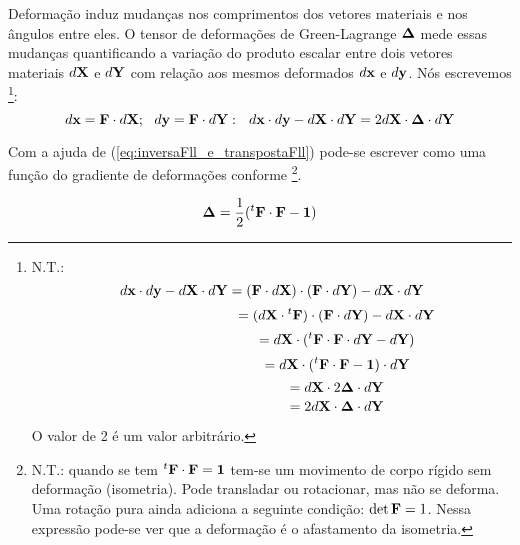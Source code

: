 \documentclass[
	11pt, %
	fleqn, %
	a4paper, %
]{LegrandOrangeBook}
\begin{document}
Deformação induz mudanças nos comprimentos dos vetores materiais e nos ângulos entre eles. O tensor de deformações de Green-Lagrange $\bm{\Delta}$ mede essas mudanças quantificando a variação do produto escalar entre dois vetores materiais $d\textbf{X}$ e $d\textbf{Y}$ com relação aos mesmos deformados $d\textbf{x}$ e $d\textbf{y}$. Nós escrevemos \footnote{N.T.: 
\begin{displaymath}	
	d\textbf{x} \cdot d\textbf{y} - d\textbf{X} \cdot d\textbf{Y} = (\textbf{F} \cdot d\textbf{X}) \cdot (\textbf{F} \cdot d\textbf{Y}) -  d\textbf{X} \cdot d\textbf{Y}
\end{displaymath}
\begin{displaymath}	
	~~~~~~~~~~~~~~~~~~~~~~~~~~~~ = (d\textbf{X} \cdot {}^t\textbf{F}) \cdot (\textbf{F} \cdot d\textbf{Y}) -  d\textbf{X} \cdot d\textbf{Y}
\end{displaymath}
\begin{displaymath}	
	~~~~~~~~~~~~~~~~~~~~~~~~~~~~ = d\textbf{X} \cdot ({}^t\textbf{F} \cdot \textbf{F} \cdot d\textbf{Y} -  d\textbf{Y})
\end{displaymath}
\begin{displaymath}	
	~~~~~~~~~~~~~~~~~~~~~~~~~~~~ = d\textbf{X} \cdot ({}^t\textbf{F} \cdot \textbf{F} -  \bm{1}) \cdot d\textbf{Y}
\end{displaymath}
\begin{displaymath}	
	~~~~~~~~~~~~~~~~~~~~~~~~~~~~ = d\textbf{X} \cdot 2 \bm{\Delta} \cdot d\textbf{Y}
\end{displaymath}
\begin{displaymath}	
	~~~~~~~~~~~~~~~~~~~~~~~~~~~~ = 2 d\textbf{X} \cdot \bm{\Delta} \cdot d\textbf{Y}
\end{displaymath}

O valor de 2 é um valor arbitrário.

}:
\begin{equation}
	\label{eq:dxdy}	
	d\textbf{x} = \textbf{F} \cdot d\textbf{X} ;  ~~ d\textbf{y} = \textbf{F} \cdot d\textbf{Y}: ~~ d\textbf{x} \cdot d\textbf{y} - d\textbf{X} \cdot d\textbf{Y} = 2d\textbf{X} \cdot \bm{\Delta} \cdot d\textbf{Y}
\end{equation}

Com a ajuda de (\ref{eq:inversaFll_e_transpostaFll}) pode-se escrever como uma função do gradiente de deformações conforme \footnote{N.T.: quando se tem ${}^t\textbf{F} \cdot \textbf{F} = \bm{1}$ tem-se um movimento de corpo rígido sem deformação (isometria). Pode transladar ou rotacionar, mas não se deforma. Uma rotação pura ainda adiciona a seguinte condição: $\det {\textbf{F}}=1$. Nessa expressão pode-se ver que a deformação é o afastamento da isometria.}.

\begin{equation}
	\label{eq:Deltall}	
	\bm{\Delta} = \dfrac{1}{2}({}^t\textbf{F} \cdot \textbf{F} - \bm{1})
\end{equation}
\end{document}
